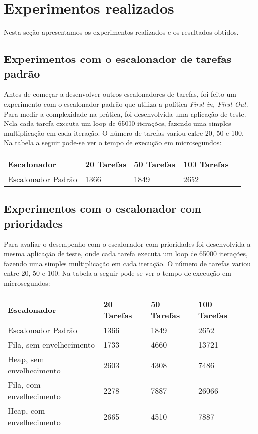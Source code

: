 \documentclass[a4paper,onecolumn, 10pt]{article}
\begin{document}

\section{Experimentos realizados}\label{resultados}
Nesta seção apresentamos os experimentos realizados e os resultados obtidos.

\subsection{Experimentos com o escalonador de tarefas padrão}
Antes de começar a desenvolver outros escalonadores de tarefas, foi feito um experimento com o escalonador 
padrão que utiliza a política \textit{First in, First Out}.
Para medir a complexidade na prática, foi desenvolvida uma aplicação de teste. Nela cada tarefa executa um loop de 65000
iterações, fazendo uma simples multiplicação em cada iteração. O número de tarefas variou entre 20, 50 e 100.
Na tabela a seguir pode-se ver o tempo de execução em microsegundos:
\begin{center}
    \begin{tabular}{ | l | l | l | l | p{5cm} |}
    \hline
    Escalonador              & 20 Tarefas & 50 Tarefas & 100 Tarefas \\ \hline
    Escalonador Padrão       & 1366 & 1849 & 2652 \\ \hline
    \end{tabular}
\end{center}

\subsection{Experimentos com o escalonador com prioridades}
Para avaliar o desempenho com o escalonador com prioridades foi desenvolvida a mesma aplicação de teste,
onde cada tarefa executa um loop de 65000 iterações, fazendo uma simples multiplicação em cada iteração. 
O número de tarefas variou entre 20, 50 e 100.
Na tabela a seguir pode-se ver o tempo de execução em microsegundos:
\begin{center}
    \begin{tabular}{ | l | l | l | l | p{5cm} |}
    \hline
    Escalonador              & 20 Tarefas & 50 Tarefas & 100 Tarefas \\ \hline
    Escalonador Padrão       & 1366 & 1849 & 2652 \\ \hline 
    Fila, sem envelhecimento & 1733 & 4660 & 13721 \\ \hline 
    Heap, sem envelhecimento & 2603 & 4308 & 7486 \\ \hline
    Fila, com envelhecimento & 2278 & 7887 & 26066 \\ \hline
    Heap, com envelhecimento & 2665 & 4510 & 7887 \\ \hline
    \end{tabular}
\end{center}
\end{document}
